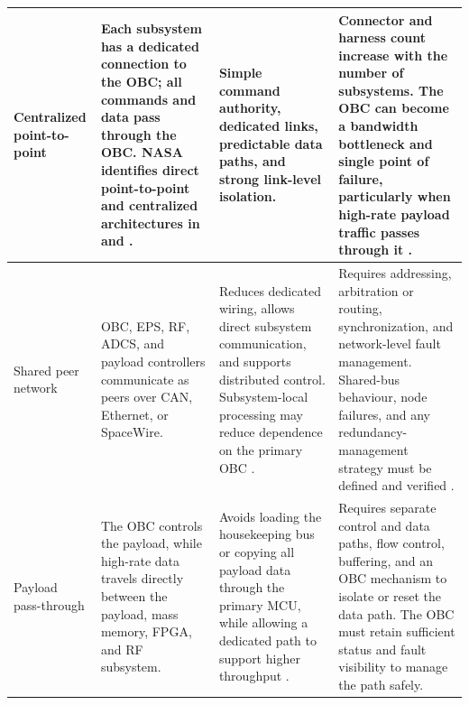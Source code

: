 \documentclass[10pt]{../datasheet}
\let\cite\citep
\begin{document}
\begin{longtable}{|
  >{\raggedright\arraybackslash}p{3.0cm}|
  >{\raggedright\arraybackslash}p{4.5cm}|
  >{\raggedright\arraybackslash}p{4.1cm}|
  >{\raggedright\arraybackslash}p{4.0cm}|}
  Centralized point-to-point                                     &
  Each subsystem has a dedicated connection to the OBC; all commands and data
  pass through the OBC. NASA identifies direct point-to-point and centralized
  architectures in
  \cite[p.~207]{nasa_soa_2022} and
  \cite[p.~226]{nasa_soa_2024}.                                  &
  Simple command authority, dedicated links, predictable data paths, and strong
  link-level isolation.                                          &
  Connector and harness count increase with the number of subsystems. The OBC
  can become a bandwidth bottleneck and single point of failure, particularly
  when high-rate payload traffic passes through it
  \cite[pp.~221--223]{nasa_soa_2026}.                                                   \\ \hline

  Shared peer network                                            &
  OBC, EPS, RF, ADCS, and payload controllers communicate as peers over CAN,
  Ethernet, or SpaceWire.                                        &
  Reduces dedicated wiring, allows direct subsystem communication, and supports
  distributed control. Subsystem-local processing may reduce dependence on the
  primary OBC \cite[pp.~221--222]{nasa_soa_2026}.                &
  Requires addressing, arbitration or routing, synchronization, and
  network-level fault management. Shared-bus behaviour, node failures, and any
  redundancy-management strategy must be defined and verified
  \cite{ecss_canbus,ecss_spacewire}.                                                    \\ \hline

  Payload pass-through                                           &
  The OBC controls the payload, while high-rate data travels directly between
  the payload, mass memory, FPGA, and RF subsystem.              &
  Avoids loading the housekeeping bus or copying all payload data through the
  primary MCU, while allowing a dedicated path to support higher throughput
  \cite[pp.~222--223]{nasa_soa_2026}.                            &
  Requires separate control and data paths, flow control, buffering, and an OBC
  mechanism to isolate or reset the data path. The OBC must retain sufficient
  status and fault visibility to manage the path safely.                                \\ \hline


\end{longtable}
\end{document}
